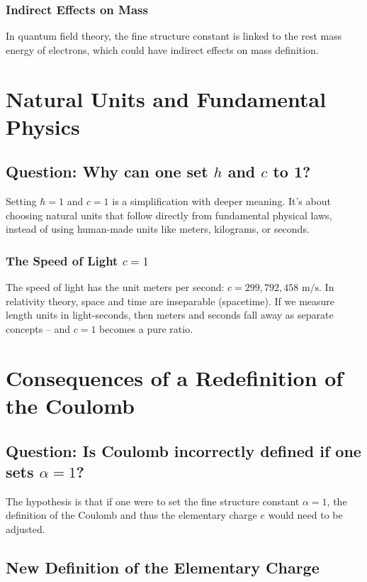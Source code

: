 \documentclass{article}
\begin{document}
	\subsubsection{Indirect Effects on Mass}
	In quantum field theory, the fine structure constant is linked to the rest mass energy of electrons, which could have indirect effects on mass definition.
	
	\section{Natural Units and Fundamental Physics}
	
	\subsection{Question: Why can one set $h$ and $c$ to 1?}
	
	Setting $\hbar = 1$ and $c = 1$ is a simplification with deeper meaning. It's about choosing natural units that follow directly from fundamental physical laws, instead of using human-made units like meters, kilograms, or seconds.
	
	\subsubsection{The Speed of Light $c = 1$}
	The speed of light has the unit meters per second: $c = 299,792,458 \text{ m/s}$. In relativity theory, space and time are inseparable (spacetime). If we measure length units in light-seconds, then meters and seconds fall away as separate concepts – and $c = 1$ becomes a pure ratio.
	
\section{Consequences of a Redefinition of the Coulomb}

\subsection{Question: Is Coulomb incorrectly defined if one sets $\alpha = 1$?}

The hypothesis is that if one were to set the fine structure constant $\alpha = 1$, the definition of the Coulomb and thus the elementary charge $e$ would need to be adjusted.

\subsection{New Definition of the Elementary Charge}
\end{document}
